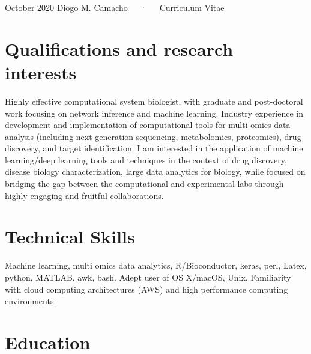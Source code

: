 \documentclass[11pt, a4paper]{awesome-cv}
\begin{document}
\makecvheader

\makecvfooter
  {October 2020}
    {Diogo M. Camacho~~~·~~~Curriculum Vitae}
  {\thepage}





\section{Qualifications and research
interests}\label{qualifications-and-research-interests}

Highly effective computational system biologist, with graduate and
post-doctoral work focusing on network inference and machine learning.
Industry experience in development and implementation of computational
tools for multi omics data analysis (including next-generation
sequencing, metabolomics, proteomics), drug discovery, and target
identification. I am interested in the application of machine
learning/deep learning tools and techniques in the context of drug
discovery, disease biology characterization, large data analytics for
biology, while focused on bridging the gap between the computational and
experimental labs through highly engaging and fruitful collaborations.

\section{Technical Skills}\label{technical-skills}

Machine learning, multi omics data analytics, R/Bioconductor, keras,
perl, Latex, python, MATLAB, awk, bash. Adept user of OS X/macOS, Unix.
Familiarity with cloud computing architectures (AWS) and high
performance computing environments.

\section{Education}\label{education}
\end{document}
